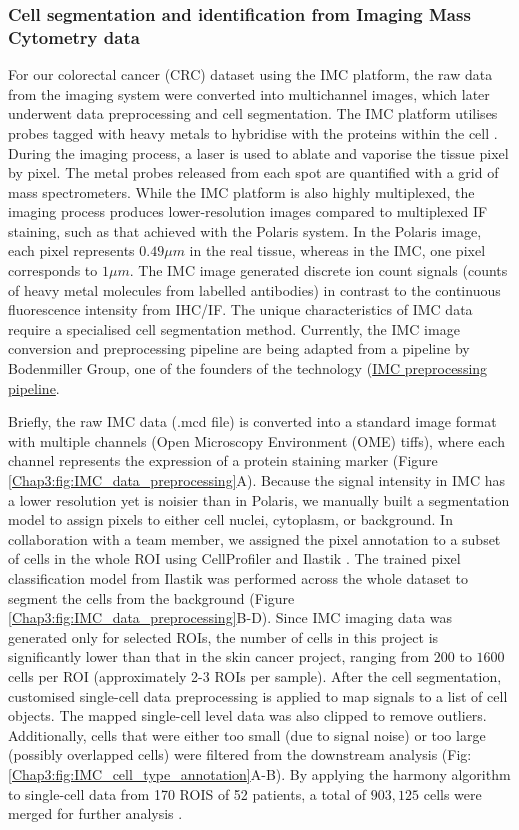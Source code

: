 \subsubsection{Cell segmentation and identification from Imaging Mass Cytometry data}
For our colorectal cancer (CRC) dataset using the IMC platform, the raw data from the imaging system were converted into multichannel images, which later underwent data preprocessing and cell segmentation. The IMC platform utilises probes tagged with heavy metals to hybridise with the proteins within the cell \cite{giesen2014IMC}. During the imaging process, a laser is used to ablate and vaporise the tissue pixel by pixel. The metal probes released from each spot are quantified with a grid of mass spectrometers. While the IMC platform is also highly multiplexed, the imaging process produces lower-resolution images compared to multiplexed IF staining, such as that achieved with the Polaris system. In the Polaris image, each pixel represents $0.49 \mu m$ in the real tissue, whereas in the IMC, one pixel corresponds to $1\mu m$. The IMC image generated discrete ion count signals (counts of heavy metal molecules from labelled antibodies) in contrast to the continuous fluorescence intensity from IHC/IF. The unique characteristics of IMC data require a specialised cell segmentation method. Currently, the IMC image conversion and preprocessing pipeline are being adapted from a pipeline by Bodenmiller Group, one of the founders of the technology (\href{https://github.com/BodenmillerGroup/ImcSegmentationPipeline/blob/development/scripts/imc_preprocessing.ipynb}{IMC preprocessing pipeline}. 

Briefly, the raw IMC data (.mcd file) is converted into a standard image format with multiple channels (Open Microscopy Environment (OME) tiffs), where each channel represents the expression of a protein staining marker (Figure \ref{Chap3:fig:IMC_data_preprocessing}A). Because the signal intensity in IMC has a lower resolution yet is noisier than in Polaris, we manually built a segmentation model to assign pixels to either cell nuclei, cytoplasm, or background. In collaboration with a team member, we assigned the pixel annotation to a subset of cells in the whole ROI using CellProfiler and Ilastik \cite{carpenter2006cellprofiler, berg2019ilastik}. The trained pixel classification model from Ilastik was performed across the whole dataset to segment the cells from the background (Figure \ref{Chap3:fig:IMC_data_preprocessing}B-D). Since IMC imaging data was generated only for selected ROIs, the number of cells in this project is significantly lower than that in the skin cancer project, ranging from $200$ to $1600$ cells per ROI (approximately 2-3 ROIs per sample). After the cell segmentation, customised single-cell data preprocessing is applied to map signals to a list of cell objects. The mapped single-cell level data was also clipped to remove outliers. Additionally, cells that were either too small (due to signal noise) or too large (possibly overlapped cells) were filtered from the downstream analysis (Fig: \ref{Chap3:fig:IMC_cell_type_annotation}A-B). By applying the harmony algorithm to single-cell data from 170 ROIS of 52 patients, a total of $903,125$ cells were merged for further analysis \cite{korsunsky2019fast}. 

